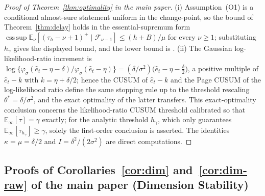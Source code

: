 \documentclass[bj,authoryear]{imsart}
\theoremstyle{plain}
\theoremstyle{definition}
\newcommand{\E}{\mathbb{E}}
\newcommand{\F}{\mathcal{F}}
\begin{document}
\begin{proof}[Proof of Theorem~\ref{thm:optimality} in the main paper]
  (i) Assumption~(O1) is a conditional almost-sure statement uniform in the
  change-point, so the bound of Theorem~\ref{thm:delay} holds in the
  essential-supremum form
  $\operatorname*{ess\,sup}\E_\nu[(\tau_h-\nu+1)^+\mid\F_{\nu-1}]\leq(h+B)/\mu$
  for every $\nu\geq1$; substituting $h_\gamma$ gives the displayed bound,
  and the lower bound is \citet{lorden1971procedures}.
  (ii) The Gaussian log-likelihood-ratio increment is
  $\log\{\varphi_\sigma(\hat e_t-\eta-\delta)/\varphi_\sigma(\hat e_t-\eta)\}
   =(\delta/\sigma^2)\bigl(\hat e_t-\eta-\tfrac{\delta}{2}\bigr)$, a positive
  multiple of $\hat e_t-k$ with $k=\eta+\delta/2$; hence the CUSUM of
  $\hat e_t-k$ and the Page CUSUM of the log-likelihood ratio define the same
  stopping rule up to the threshold rescaling $\theta^\ast=\delta/\sigma^2$,
  and the exact optimality of the latter \citep{moustakides1986optimal}
  transfers.  This exact-optimality conclusion concerns the likelihood-ratio
  CUSUM threshold calibrated so that $\E_\infty[\tau]=\gamma$ exactly; for the
  analytic threshold $h_\gamma$, which only guarantees
  $\E_\infty[\tau_{h_\gamma}]\geq\gamma$, solely the first-order conclusion is
  asserted.  The identities $\kappa=\mu=\delta/2$ and
  $I=\delta^2/(2\sigma^2)$ are direct computations.
\end{proof}

\subsection{Proofs of Corollaries~\ref{cor:dim} and~\ref{cor:dim-raw} of the main paper (Dimension Stability)}
\label{app:proof-cordim}
\end{document}

